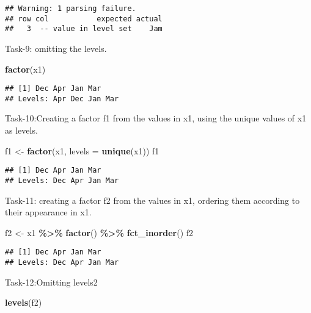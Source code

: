 \documentclass[
]{article}
\newenvironment{Shaded}{\begin{snugshade}}{\end{snugshade}}
\newcommand{\AttributeTok}[1]{\textcolor[rgb]{0.13,0.29,0.53}{#1}}
\newcommand{\FunctionTok}[1]{\textcolor[rgb]{0.13,0.29,0.53}{\textbf{#1}}}
\newcommand{\NormalTok}[1]{#1}
\newcommand{\OtherTok}[1]{\textcolor[rgb]{0.56,0.35,0.01}{#1}}
\newcommand{\SpecialCharTok}[1]{\textcolor[rgb]{0.81,0.36,0.00}{\textbf{#1}}}
\begin{document}
\begin{verbatim}
## Warning: 1 parsing failure.
## row col           expected actual
##   3  -- value in level set    Jam
\end{verbatim}

Task-9: omitting the levels.

\begin{Shaded}
\begin{Highlighting}[]
\FunctionTok{factor}\NormalTok{(x1)}
\end{Highlighting}
\end{Shaded}

\begin{verbatim}
## [1] Dec Apr Jan Mar
## Levels: Apr Dec Jan Mar
\end{verbatim}

Task-10:Creating a factor f1 from the values in x1, using the unique
values of x1 as levels.

\begin{Shaded}
\begin{Highlighting}[]
\NormalTok{f1 }\OtherTok{\textless{}{-}} \FunctionTok{factor}\NormalTok{(x1, }\AttributeTok{levels =} \FunctionTok{unique}\NormalTok{(x1))}
\NormalTok{f1}
\end{Highlighting}
\end{Shaded}

\begin{verbatim}
## [1] Dec Apr Jan Mar
## Levels: Dec Apr Jan Mar
\end{verbatim}

Task-11: creating a factor f2 from the values in x1, ordering them
according to their appearance in x1.

\begin{Shaded}
\begin{Highlighting}[]
\NormalTok{f2 }\OtherTok{\textless{}{-}}\NormalTok{ x1 }\SpecialCharTok{\%\textgreater{}\%} \FunctionTok{factor}\NormalTok{() }\SpecialCharTok{\%\textgreater{}\%} \FunctionTok{fct\_inorder}\NormalTok{()}
\NormalTok{f2}
\end{Highlighting}
\end{Shaded}

\begin{verbatim}
## [1] Dec Apr Jan Mar
## Levels: Dec Apr Jan Mar
\end{verbatim}

Task-12:Omitting levels2

\begin{Shaded}
\begin{Highlighting}[]
\FunctionTok{levels}\NormalTok{(f2)}
\end{Highlighting}
\end{Shaded}
\end{document}
